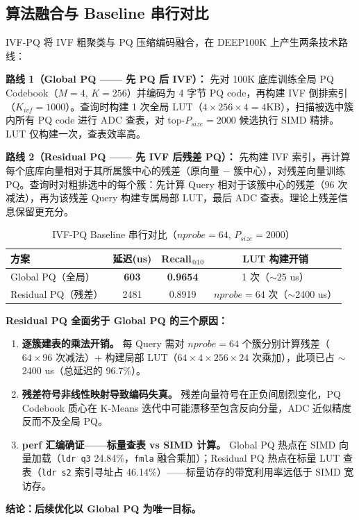\documentclass[UTF8,a4paper,10pt]{ctexart}
\begin{document}
\subsection{算法融合与 Baseline 串行对比}

IVF-PQ 将 IVF 粗聚类与 PQ 压缩编码融合，在 DEEP100K 上产生两条技术路线：

\textbf{路线 1（Global PQ —— 先 PQ 后 IVF）：} 先对 100K 底库训练全局 PQ Codebook（$M=4$, $K=256$）并编码为 4 字节 PQ code，再构建 IVF 倒排索引（$K_{ivf}=1000$）。查询时构建 1 次全局 LUT（$4\times256\times4=4$KB），扫描被选中簇内所有 PQ code 进行 ADC 查表，对 top-$P_{size}=2000$ 候选执行 SIMD 精排。LUT 仅构建一次，查表效率高。

\textbf{路线 2（Residual PQ —— 先 IVF 后残差 PQ）：} 先构建 IVF 索引，再计算每个底库向量相对于其所属簇中心的残差（原向量 $-$ 簇中心），对残差向量训练 PQ。查询时对粗排选中的每个簇：先计算 Query 相对于该簇中心的残差（$96$ 次减法），再为该残差 Query 构建专属局部 LUT，最后 ADC 查表。理论上残差信息保留更充分。

\begin{table}[H]
\centering
\caption{IVF-PQ Baseline 串行对比（$nprobe=64$, $P_{size}=2000$）}
\begin{tabular}{lccc}
\hline
方案 & 延迟(us) & Recall$_{@10}$ & LUT 构建开销 \\
\hline
Global PQ（全局） & \textbf{603} & \textbf{0.9654} & 1 次（$\sim$25 us） \\
Residual PQ（残差） & 2481 & 0.8919 & $nprobe=64$ 次（$\sim$2400 us） \\
\hline
\end{tabular}
\end{table}

\textbf{Residual PQ 全面劣于 Global PQ 的三个原因：}
\begin{enumerate}
\item \textbf{逐簇建表的乘法开销。} 每 Query 需对 $nprobe=64$ 个簇分别计算残差（$64\times96$ 次减法）+ 构建局部 LUT（$64\times4\times256\times24$ 次乘加），此项已占 $\sim$2400 us（总延迟的 96.7\%）。
\item \textbf{残差符号非线性映射导致编码失真。} 残差向量符号在正负间剧烈变化，PQ Codebook 质心在 K-Means 迭代中可能漂移至包含反向分量，ADC 近似精度反而不及全局 PQ。
\item \textbf{perf 汇编确证——标量查表 vs SIMD 计算。} Global PQ 热点在 SIMD 向量加载（\texttt{ldr q3} 24.84\%，\texttt{fmla} 融合乘加）；Residual PQ 热点在标量 LUT 查表（\texttt{ldr s2} 索引寻址占 46.14\%）——标量访存的带宽利用率远低于 SIMD 宽访存。
\end{enumerate}
\textbf{结论：后续优化以 Global PQ 为唯一目标。}
\end{document}
